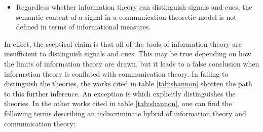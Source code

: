 \begin{itemize}
    \item Regardless whether information theory can distinguish signals and cues, the semantic content of a signal in a communication-theoretic model is not defined in terms of informational measures.
\end{itemize}

\noindent 
In effect, the sceptical claim is that all of the tools of information theory are insufficient to distinguish signals and cues.
This may be true depending on how the limits of information theory are drawn, but it leads to a false conclusion when information theory is conflated with communication theory.
In failing to distinguish the theories, the works cited in table \ref{tab:shannon} shorten the path to this further inference.
An exception is \citet[17-20]{piccinini2011information} which explicitly distinguishes the theories.
In the other works cited in table \ref{tab:shannon}, one can find the following terms describing an indiscriminate hybrid of information theory and communication theory:

